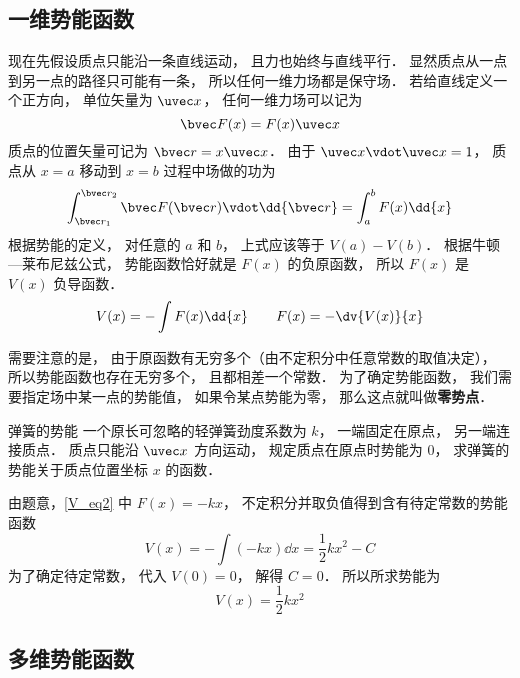 \subsection{一维势能函数}

现在先假设质点只能沿一条直线运动， 且力也始终与直线平行． 显然质点从一点到另一点的路径只可能有一条， 所以任何一维力场都是保守场． 若给直线定义一个正方向， 单位矢量为 $\uvec x$， 任何一维力场可以记为
\begin{equation}\label{V_eq2}
\bvec F(x) = F(x) \uvec x
\end{equation}
质点的位置矢量可记为 $\bvec r = x \uvec x$． 由于 $\uvec x \vdot \uvec x = 1$， 质点从 $x = a$ 移动到 $x=b$ 过程中场做的功为
\begin{equation}
\int_{\bvec r_1}^{\bvec r_2} \bvec F(\bvec r) \vdot \dd{\bvec r}
= \int_a^b F(x) \dd{x}
\end{equation}
根据势能的定义， 对任意的 $a$ 和 $b$， 上式应该等于 $V(a) - V(b)$． 根据牛顿—莱布尼兹公式， 势能函数恰好就是 $F(x)$ 的负原函数， 所以 $F(x)$ 是 $V(x)$ 负导函数．
\begin{equation}\label{V_eq8}
V(x) = -\int F(x) \dd{x}
\qquad
F(x) = -\dv{V(x)}{x}
\end{equation}

需要注意的是， 由于原函数有无穷多个（由不定积分中任意常数的取值决定）， 所以势能函数也存在无穷多个， 且都相差一个常数． 为了确定势能函数， 我们需要指定场中某一点的势能值， 如果令某点势能为零， 那么这点就叫做\textbf{零势点}．

\begin{example}{弹簧的势能}
一个原长可忽略的轻弹簧劲度系数为 $k$， 一端固定在原点， 另一端连接质点． 质点只能沿 $\uvec x$ 方向运动， 规定质点在原点时势能为 $0$， 求弹簧的势能关于质点位置坐标 $x$ 的函数． 

由题意，\autoref{V_eq2} 中 $F(x) = -kx$， 不定积分并取负值得到含有待定常数的势能函数
\begin{equation}
V(x) = -\int (-kx) \dd{x} = \frac12 k x^2 - C
\end{equation}
为了确定待定常数， 代入 $V(0) = 0$， 解得 $C = 0$． 所以所求势能为
\begin{equation}
V(x) =  \frac12 k x^2
\end{equation}
\end{example}


\subsection{多维势能函数}

